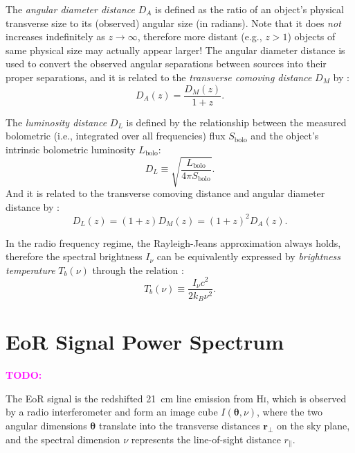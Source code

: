 \documentclass[modern]{aastex61}
\newcommand{\R}[1]{\mathrm{#1}}
\newcommand{\Hi}{H\textsc{i}}
\newcommand{\TODO}[1]{\textcolor{magenta}{\textbf{TODO:}}~\uuline{#1}}
\begin{document}
The \emph{angular diameter distance} $D_A$ is defined as the ratio of
an object's physical transverse size to its (observed) angular size
(in radians).  Note that it does \emph{not} increases indefinitely
as $z \to \infty$, therefore more distant (e.g., $z > 1$)
objects of same physical size may actually appear larger!
The angular diameter distance is used to convert the observed angular
separations between sources into their proper separations, and it is
related to the \emph{transverse comoving distance} $D_M$ by
\citep{weinberg1972,peebles1993,hogg1999}:
\begin{equation}
  \label{eq:da-dm}
  D_A(z) = \frac{D_M(z)}{1 + z}.
\end{equation}

The \emph{luminosity distance} $D_L$ is defined by the relationship
between the measured bolometric (i.e., integrated over all frequencies)
flux $S_{\R{bolo}}$ and the object's intrinsic bolometric luminosity
$L_{\R{bolo}}$:
\begin{equation}
  \label{eq:dl-def}
  D_L \equiv \sqrt{\frac{L_{\R{bolo}}}{4\pi S_{\R{bolo}}}}.
\end{equation}
And it is related to the transverse comoving distance and angular
diameter distance by \citep{weinberg1972,hogg1999,ellis2007}:
\begin{equation}
  \label{eq:dl-dm-da}
  D_L(z) = (1+z) D_M(z) = (1+z)^2 D_A(z).
\end{equation}

In the radio frequency regime, the Rayleigh-Jeans approximation
always holds, therefore the spectral brightness $I_{\nu}$ can be
equivalently expressed by \emph{brightness temperature} $T_b(\nu)$
through the relation \citep{condon2016}:
\begin{equation}
  \label{eq:brightness-temp}
  T_b(\nu) \equiv \frac{I_{\nu} c^2}{2 k_B \nu^2}.
\end{equation}


\color{magenta}
\section{EoR Signal Power Spectrum}
\label{sec:power-spectrum}

\TODO{draw a diagram}

The EoR signal is the redshifted \SI{21}{\cm} line emission from \Hi{},
which is observed by a radio interferometer and form an image cube
$I(\bm{\theta}, \nu)$, where the two angular dimensions $\bm{\theta}$
translate into the transverse distances $\bm{r}_{\bot}$ on the sky plane,
and the spectral dimension $\nu$ represents the line-of-sight distance
$r_{\parallel}$.
\end{document}
